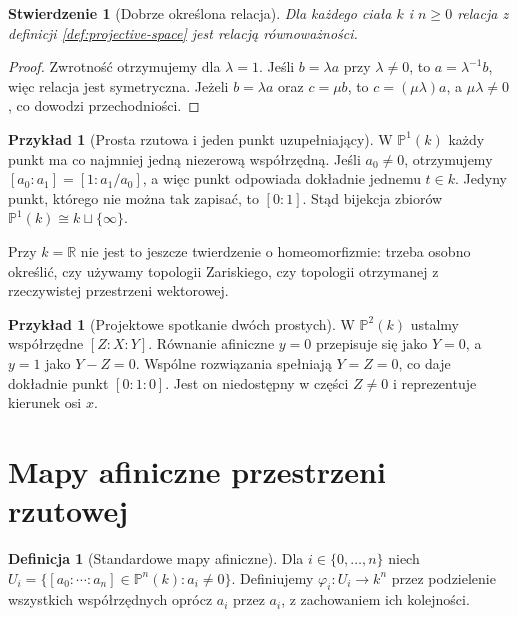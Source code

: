 \documentclass[11pt,a4paper,openany]{report}
\numberwithin{equation}{section}
\theoremstyle{plain}
\newtheorem{stwierdzenie}[twierdzenie]{Stwierdzenie}
\theoremstyle{definition}
\newtheorem{definicja}[twierdzenie]{Definicja}
\newtheorem{przyklad}[twierdzenie]{Przykład}
\theoremstyle{remark}
\newcommand{\R}{\mathbb R}
\newcommand{\PP}{\mathbb P}
\begin{document}
\begin{stwierdzenie}[Dobrze określona relacja]
Dla każdego ciała $k$ i $n\ge0$ relacja z definicji
\ref{def:projective-space} jest relacją równoważności.
\end{stwierdzenie}
\begin{proof}
Zwrotność otrzymujemy dla $\lambda=1$. Jeśli $b=\lambda a$
przy $\lambda\ne0$, to $a=\lambda^{-1}b$, więc relacja jest
symetryczna. Jeżeli $b=\lambda a$ oraz $c=\mu b$, to
$c=(\mu\lambda)a$, a $\mu\lambda\ne0$, co dowodzi
przechodniości.
\end{proof}

\begin{przyklad}[Prosta rzutowa i jeden punkt uzupełniający]
W $\PP^1(k)$ każdy punkt ma co najmniej jedną niezerową
współrzędną. Jeśli $a_0\ne0$, otrzymujemy
$[a_0:a_1]=[1:a_1/a_0]$, a więc punkt odpowiada dokładnie
jednemu $t\in k$. Jedyny punkt, którego nie można tak zapisać,
to $[0:1]$. Stąd bijekcja zbiorów
$\PP^1(k)\cong k\sqcup\{\infty\}$.

Przy $k=\R$ nie jest to jeszcze twierdzenie o homeomorfizmie:
trzeba osobno określić, czy używamy topologii Zariskiego,
czy topologii otrzymanej z rzeczywistej przestrzeni wektorowej.
\end{przyklad}

\begin{przyklad}[Projektowe spotkanie dwóch prostych]
W $\PP^2(k)$ ustalmy współrzędne $[Z:X:Y]$.
Równanie afiniczne $y=0$ przepisuje się jako $Y=0$,
a $y=1$ jako $Y-Z=0$. Wspólne rozwiązania spełniają
$Y=Z=0$, co daje dokładnie punkt $[0:1:0]$.
Jest on niedostępny w części $Z\ne0$ i reprezentuje kierunek
osi $x$.
\end{przyklad}

\section{Mapy afiniczne przestrzeni rzutowej}

\begin{definicja}[Standardowe mapy afiniczne]
Dla $i\in\{0,\ldots,n\}$ niech
$U_i=\{[a_0:\cdots:a_n]\in\PP^n(k):a_i\ne0\}$.
Definiujemy $\varphi_i:U_i\to k^n$ przez podzielenie
wszystkich współrzędnych oprócz $a_i$ przez $a_i$,
z zachowaniem ich kolejności.
\end{definicja}
\end{document}
